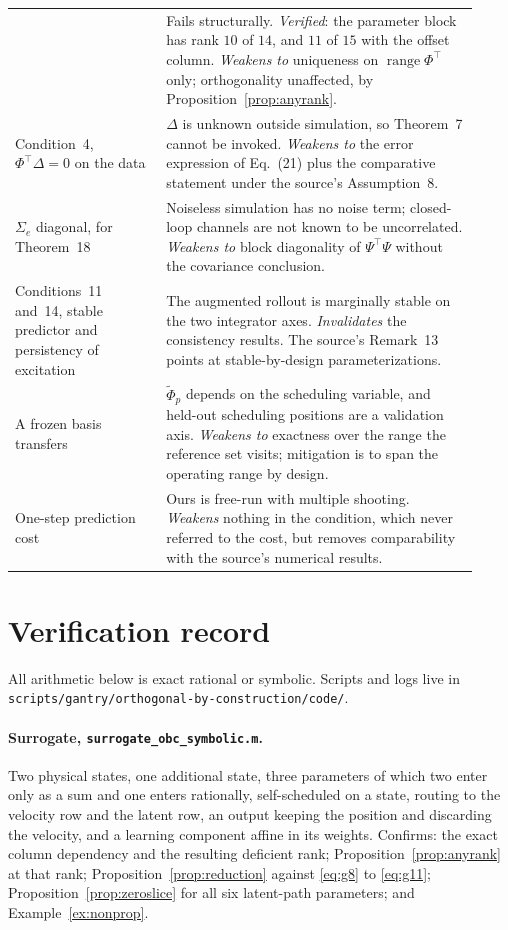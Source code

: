 \documentclass[11pt,a4paper]{article}
\newcommand{\ran}{\operatorname{range}}
\newcommand{\code}[1]{\nolinkurl{#1}}
\theoremstyle{remark}
\begin{document}
\begin{longtable}{@{}p{0.30\linewidth}p{0.62\linewidth}@{}}
& Fails structurally. \emph{Verified}: the parameter block has rank $10$ of $14$, and $11$ of $15$
with the offset column. \emph{Weakens to} uniqueness on $\ran\Phi^\top$ only; orthogonality
unaffected, by Proposition~\ref{prop:anyrank}.\\
Condition~4, $\Phi^\top\Delta=0$ on the data
& $\Delta$ is unknown outside simulation, so Theorem~7 cannot be invoked. \emph{Weakens to} the
error expression of Eq.~(21) plus the comparative statement under the source's Assumption~8.\\
$\Sigma_e$ diagonal, for Theorem~18
& Noiseless simulation has no noise term; closed-loop channels are not known to be uncorrelated.
\emph{Weakens to} block diagonality of $\Psi^\top\Psi$ without the covariance conclusion.\\
Conditions~11 and~14, stable predictor and persistency of excitation
& The augmented rollout is marginally stable on the two integrator axes. \emph{Invalidates} the
consistency results. The source's Remark~13 points at stable-by-design parameterizations.\\
A frozen basis transfers
& $\widetilde\Phi_p$ depends on the scheduling variable, and held-out scheduling positions are a
validation axis. \emph{Weakens to} exactness over the range the reference set visits; mitigation
is to span the operating range by design.\\
One-step prediction cost
& Ours is free-run with multiple shooting. \emph{Weakens} nothing in the condition, which never
referred to the cost, but removes comparability with the source's numerical results.\\
\bottomrule
\end{longtable}

\section{Verification record}\label{sec:verif}

All arithmetic below is exact rational or symbolic. Scripts and logs live in
\code{scripts/gantry/orthogonal-by-construction/code/}.

\paragraph{Surrogate, \code{surrogate\_obc\_symbolic.m}.}
Two physical states, one additional state, three parameters of which two enter only as a sum and
one enters rationally, self-scheduled on a state, routing to the velocity row and the latent row,
an output keeping the position and discarding the velocity, and a learning component affine in its
weights. Confirms: the exact column dependency and the resulting deficient rank;
Proposition~\ref{prop:anyrank} at that rank; Proposition~\ref{prop:reduction} against
\eqref{eq:g8} to \eqref{eq:g11}; Proposition~\ref{prop:zeroslice} for all six latent-path
parameters; and Example~\ref{ex:nonprop}.
\end{document}
